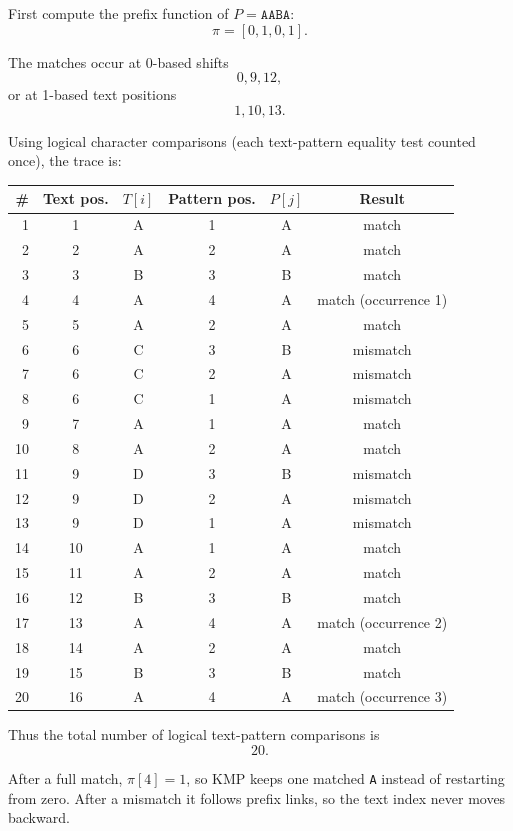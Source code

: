 \documentclass[11pt,a4paper]{article}
\begin{document}
\begin{qaanswer}[Answer 3(a)]
First compute the prefix function of \(P=\texttt{AABA}\):
\[
\boxed{\pi=[0,1,0,1]}.
\]

The matches occur at 0-based shifts
\[
\boxed{0,9,12},
\]
or at 1-based text positions
\[
\boxed{1,10,13}.
\]

Using logical character comparisons (each text-pattern equality test counted once), the trace is:

\begin{center}
\scriptsize
\begin{tabular}{r c c c c c}
\toprule
\# & Text pos. & \(T[i]\) & Pattern pos. & \(P[j]\) & Result\\
\midrule
1&1&A&1&A&match\\
2&2&A&2&A&match\\
3&3&B&3&B&match\\
4&4&A&4&A&match (occurrence 1)\\
5&5&A&2&A&match\\
6&6&C&3&B&mismatch\\
7&6&C&2&A&mismatch\\
8&6&C&1&A&mismatch\\
9&7&A&1&A&match\\
10&8&A&2&A&match\\
11&9&D&3&B&mismatch\\
12&9&D&2&A&mismatch\\
13&9&D&1&A&mismatch\\
14&10&A&1&A&match\\
15&11&A&2&A&match\\
16&12&B&3&B&match\\
17&13&A&4&A&match (occurrence 2)\\
18&14&A&2&A&match\\
19&15&B&3&B&match\\
20&16&A&4&A&match (occurrence 3)\\
\bottomrule
\end{tabular}
\end{center}

Thus the total number of logical text-pattern comparisons is
\[
\boxed{20}.
\]

\begin{pointbox}
After a full match, \(\pi[4]=1\), so KMP keeps one matched \texttt{A} instead of restarting from zero. After a mismatch it follows prefix links, so the text index never moves backward.
\end{pointbox}
\end{qaanswer}
\end{document}
